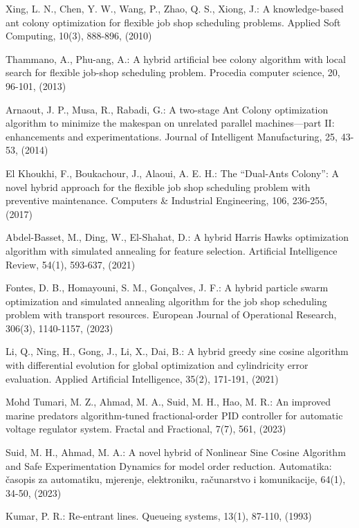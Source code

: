 \begin{thebibliography}{8}
	Xing, L. N., Chen, Y. W., Wang, P., Zhao, Q. S., Xiong, J.: A knowledge-based ant colony optimization for flexible job shop scheduling problems. Applied Soft Computing, 10(3), 888-896,  (2010)
	
	Thammano, A., Phu-ang, A.: A hybrid artificial bee colony algorithm with local search for flexible job-shop scheduling problem. Procedia computer science, 20, 96-101, (2013)
	
	Arnaout, J. P., Musa, R., Rabadi, G.: A two-stage Ant Colony optimization algorithm to minimize the makespan on unrelated parallel machines—part II: enhancements and experimentations. Journal of Intelligent Manufacturing, 25, 43-53, (2014)
	
	El Khoukhi, F., Boukachour, J., Alaoui, A. E. H.: The “Dual-Ants Colony”: A novel hybrid approach for the flexible job shop scheduling problem with preventive maintenance. Computers \& Industrial Engineering, 106, 236-255,  (2017)
	
	
	Abdel-Basset, M., Ding, W., El-Shahat, D.: A hybrid Harris Hawks optimization algorithm with simulated annealing for feature selection. Artificial Intelligence Review, 54(1), 593-637, (2021)
	
	Fontes, D. B., Homayouni, S. M., Gonçalves, J. F.: A hybrid particle swarm optimization and simulated annealing algorithm for the job shop scheduling problem with transport resources. European Journal of Operational Research, 306(3), 1140-1157, (2023)
	
	Li, Q., Ning, H., Gong, J., Li, X., Dai, B.: A hybrid greedy sine cosine algorithm with differential evolution for global optimization and cylindricity error evaluation. Applied Artificial Intelligence, 35(2), 171-191, (2021)
	
	Mohd Tumari, M. Z., Ahmad, M. A., Suid, M. H., Hao, M. R.: An improved marine predators algorithm-tuned fractional-order PID controller for automatic voltage regulator system. Fractal and Fractional, 7(7), 561, (2023)
	
	Suid, M. H., Ahmad, M. A.: A novel hybrid of Nonlinear Sine Cosine Algorithm and Safe Experimentation Dynamics for model order reduction. Automatika: časopis za automatiku, mjerenje, elektroniku, računarstvo i komunikacije, 64(1), 34-50, (2023)
	
	Kumar, P. R.: Re-entrant lines. Queueing systems, 13(1), 87-110, (1993)
	

\end{thebibliography}
